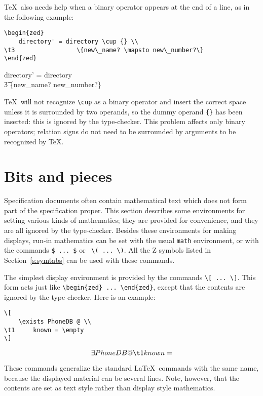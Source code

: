 \documentclass{article}
\def\gives{\endquote\endgroup\egroup}
\begin{document}
\TeX\ also needs help when a binary operator appears at the end of a
line, as in the following example:
\begin{demo}
\begin{verbatim}
\begin{zed}
    directory' = directory \cup {} \\
\t3                 \{new\_name? \mapsto new\_number?\}
\end{zed}
\end{verbatim}
\gives
\begin{zed}
    directory' = directory \cup {} \\
\t3                 \{new\_name? \mapsto new\_number?\}
\end{zed}
\end{demo}
\TeX\ will not recognize %
\verb/\cup/ as a binary operator and insert
the correct space unless it is surrounded by two operands, so the
dummy operand %
\verb/{}/ has been inserted: this is ignored by the
type-checker. This problem affects only binary operators; relation
signs do not need to be surrounded by arguments to be recognized by
\TeX.

\section{Bits and pieces}

Specification documents often contain mathematical text which does not
form part of the specification proper. This section describes some
environments for setting various kinds of mathematics; they are
provided for convenience, and they are all ignored by the
type-checker. Besides these environments for making displays, run-in
mathematics can be set with the usual %
\verb/math/ environment, or with
the commands %
\verb/$ ... $/ or \hbox{%
\verb/\( ... \)/}. All the Z
symbols listed in Section~\ref{s:symtabs} can be used with these
commands.

The simplest display environment is provided by the commands
%
\verb/\[ ... \]/.  This form acts just like %
\verb/\begin{zed} ... \end{zed}/, except that the contents are ignored by the
type-checker. Here is an example:
\begin{demo}
\begin{verbatim}
\[
    \exists PhoneDB @ \\
\t1     known = \empty
\]       
\end{verbatim}
\gives
\[
    \exists PhoneDB @ \\
\t1     known = \empty
\]       
\end{demo}
These commands generalize the standard \LaTeX\ commands with the same
name, because the displayed material can be several lines. Note,
however, that the contents are set as text style rather than display
style mathematics.
\end{document}
